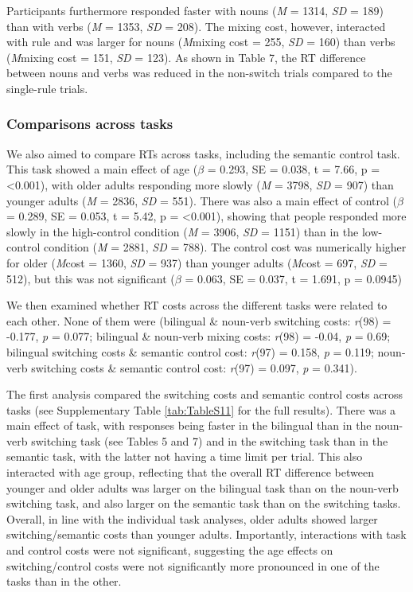 \documentclass[
]{article}
\begin{document}
Participants furthermore responded faster with nouns (\emph{M} = 1314, \emph{SD} = 189) than with verbs (\emph{M} = 1353, \emph{SD} = 208). The mixing cost, however, interacted with rule and was larger for nouns (\emph{M}mixing cost = 255, \emph{SD} = 160) than verbs (\emph{M}mixing cost = 151, \emph{SD} = 123). As shown in Table 7, the RT difference between nouns and verbs was reduced in the non-switch trials compared to the single-rule trials.

\hypertarget{comparisons-across-tasks}{%
\subsubsection{Comparisons across tasks}\label{comparisons-across-tasks}}

We also aimed to compare RTs across tasks, including the semantic control task. This task showed a main effect of age (\(\beta\) = 0.293, SE = 0.038, t = 7.66, p = \textless0.001), with older adults responding more slowly (\emph{M} = 3798, \emph{SD} = 907) than younger adults (\emph{M} = 2836, \emph{SD} = 551). There was also a main effect of control (\(\beta\) = 0.289, SE = 0.053, t = 5.42, p = \textless0.001), showing that people responded more slowly in the high-control condition (\emph{M} = 3906, \emph{SD} = 1151) than in the low-control condition (\emph{M} = 2881, \emph{SD} = 788). The control cost was numerically higher for older (\emph{M}cost = 1360, \emph{SD} = 937) than younger adults (\emph{M}cost = 697, \emph{SD} = 512), but this was not significant (\(\beta\) = 0.063, SE = 0.037, t = 1.691, p = 0.0945)

We then examined whether RT costs across the different tasks were related to each other. None of them were (bilingual \& noun-verb switching costs: \emph{r}(98) = -0.177, \emph{p} = 0.077; bilingual \& noun-verb mixing costs: \emph{r}(98) = -0.04, \emph{p} = 0.69; bilingual switching costs \& semantic control cost: \emph{r}(97) = 0.158, \emph{p} = 0.119; noun-verb switching costs \& semantic control cost: \emph{r}(97) = 0.097, \emph{p} = 0.341).

The first analysis compared the switching costs and semantic control costs across tasks (see Supplementary Table \ref{tab:TableS11} for the full results). There was a main effect of task, with responses being faster in the bilingual than in the noun-verb switching task (see Tables 5 and 7) and in the switching task than in the semantic task, with the latter not having a time limit per trial. This also interacted with age group, reflecting that the overall RT difference between younger and older adults was larger on the bilingual task than on the noun-verb switching task, and also larger on the semantic task than on the switching tasks. Overall, in line with the individual task analyses, older adults showed larger switching/semantic costs than younger adults. Importantly, interactions with task and control costs were not significant, suggesting the age effects on switching/control costs were not significantly more pronounced in one of the tasks than in the other.
\end{document}
